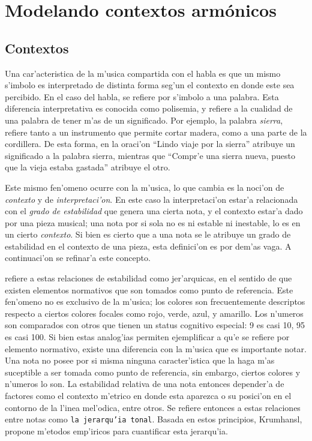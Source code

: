 \section{Modelando contextos arm\'onicos}
\label{sec:harmonic_contexts}
\subsection{Contextos}
Una car'acteristica de la m'usica compartida con el habla es que un mismo s'imbolo es interpretado de distinta forma seg'un el contexto
en donde este sea percibido. En el caso del habla, se refiere por s'imbolo a una palabra. Esta diferencia interpretativa es conocida 
como polisemia, y refiere a la cualidad de una palabra de tener m'as de un significado. Por ejemplo, la palabra \emph{sierra}, refiere
tanto a un instrumento que permite cortar madera, como a una parte de la cordillera. De esta forma, en la oraci'on 
``Lindo viaje por la sierra'' atribuye un significado a la palabra sierra, mientras que ``Compr'e una sierra nueva, puesto que la vieja 
estaba gastada'' atribuye el otro. 

Este mismo fen'omeno ocurre con la m'usica, lo que cambia es la noci'on de \emph{contexto} y de \emph{interpretaci'on}. En este caso
la interpretaci'on estar'a relacionada con el \emph{grado de estabilidad} que genera una cierta nota, y el contexto estar'a dado por
una pieza musical; una nota por si sola no es ni estable ni inestable, lo es en un cierto \emph{contexto}. Si bien es cierto que a una nota
se le atribuye un grado de estabilidad en el contexto de una pieza, esta definici'on es por dem'as vaga. A continuaci'on se refinar'a
este concepto.  

\cite{Krumhansl90} refiere a estas relaciones de estabilidad como jer'arquicas, en el sentido de que existen elementos normativos que son tomados 
como punto de referencia. Este fen'omeno no es exclusivo de la m'usica; los colores son frecuentemente descriptos respecto a ciertos colores 
focales como rojo, verde, azul, y amarillo. Los n'umeros son comparados con otros que tienen un status cognitivo especial: 9 es casi 10, 95 es casi 100. 
Si bien estas analog'ias permiten ejemplificar a qu'e se refiere por elemento normativo, existe una diferencia con la m'usica que es importante notar. 
Una nota no posee por si misma ninguna caracter'istica que la haga m'as suceptible a ser tomada como punto de referencia, sin embargo, ciertos
colores y n'umeros lo son. La estabilidad relativa de una nota entonces 
depender'a de factores como el contexto m'etrico en donde esta aparezca o su posici'on en el contorno de la l'inea mel'odica, entre otros. 
Se refiere entonces a estas relaciones entre notas como \texttt{la jerarqu'ia tonal}. Basada en estos principios, Krumhansl, propone m'etodos 
emp'iricos para cuantificar esta jerarqu'ia.

